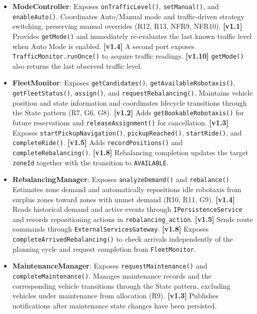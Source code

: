 \documentclass[11pt,a4paper,oneside]{report}
\newcommand{\code}[1]{\texttt{#1}}
\begin{document}
\begin{itemize}
\item
  \textbf{ModeController}: Exposes \code{onTrafficLevel()},
  \code{setManual()}, and \code{enableAuto()}.
  Coordinates Auto/Manual mode and traffic-driven strategy
  switching, preserving manual overrides (R12, R13, NFR9, NFR10).
  \textbf{[v1.1]} Provides \code{getMode()} and immediately
  re-evaluates the last known traffic level when Auto Mode is enabled.
  \textbf{[v1.4]} A second port exposes
  \code{TrafficMonitor.runOnce()} to acquire traffic readings.
  \textbf{[v1.10]} \code{getMode()} also returns the last observed
  traffic level.

\item
  \textbf{FleetMonitor}: Exposes \code{getCandidates()},
  \code{getAvailableRobotaxis()}, \code{getFleetStatus()},
  \code{assign()}, and \code{requestRebalancing()}.
  Maintains vehicle position and state information and coordinates
  lifecycle transitions through the State pattern (R7, G6, G8).
  \textbf{[v1.2]} Adds \code{getBookableRobotaxis()} for future
  reservations and \code{releaseAssignment()} for cancellation.
  \textbf{[v1.3]} Exposes \code{startPickupNavigation()},
  \code{pickupReached()}, \code{startRide()}, and
  \code{completeRide()}.
  \textbf{[v1.5]} Adds \code{recordPositions()} and
  \code{completeRebalancing()}.
  \textbf{[v1.8]} Rebalancing completion updates the target
  \code{zoneId} together with the transition to \code{AVAILABLE}.

\item
  \textbf{RebalancingManager}: Exposes \code{analyzeDemand()}
  and \code{rebalance()}.
  Estimates zone demand and automatically repositions idle
  robotaxis from surplus zones toward zones with unmet demand
  (R10, R11, G9).
  \textbf{[v1.4]} Reads historical demand and active events through
  \code{IPersistenceService} and records repositioning actions
  in \code{rebalancing\_action}.
  \textbf{[v1.5]} Sends route commands through
  \code{ExternalServicesGateway}.
  \textbf{[v1.8]} Exposes \code{completeArrivedRebalancing()}
  to check arrivals independently of the planning cycle and
  request completion from \code{FleetMonitor}.

\item
  \textbf{MaintenanceManager}: Exposes
  \code{requestMaintenance()} and \code{completeMaintenance()}.
  Manages maintenance records and the corresponding vehicle
  transitions through the State pattern, excluding vehicles
  under maintenance from allocation (R9).
  \textbf{[v1.3]} Publishes notifications after maintenance
  state changes have been persisted.


\end{itemize}
\end{document}
